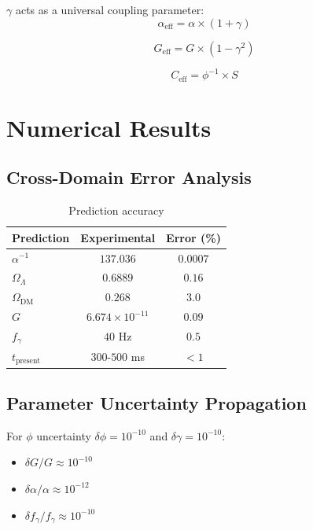 \documentclass[12pt,a4paper]{article}
\begin{document}
$\gamma$ acts as a universal coupling parameter:
\begin{equation}
\alpha_{\text{eff}} = \alpha \times (1 + \gamma)
\end{equation}

\begin{equation}
G_{\text{eff}} = G \times (1 - \gamma^2)
\end{equation}

\begin{equation}
C_{\text{eff}} = \phi^{-1} \times S
\end{equation}

\section{Numerical Results}

\subsection{Cross-Domain Error Analysis}

\begin{table}[h]
\centering
\begin{tabular}{lcc}
\toprule
Prediction & Experimental & Error (\%) \\
\midrule
$\alpha^{-1}$ & $137.036$ & $0.0007$ \\
$\Omega_\Lambda$ & $0.6889$ & $0.16$ \\
$\Omega_{\text{DM}}$ & $0.268$ & $3.0$ \\
$G$ & $6.674 \times 10^{-11}$ & $0.09$ \\
$f_\gamma$ & $40$ Hz & $0.5$ \\
$t_{\text{present}}$ & $300\text{-}500$ ms & $< 1$ \\
\bottomrule
\end{tabular}
\caption{Prediction accuracy}
\end{table}

\subsection{Parameter Uncertainty Propagation}

For $\phi$ uncertainty $\delta\phi = 10^{-10}$ and $\delta\gamma = 10^{-10}$:
\begin{itemize}
\item $\delta G/G \approx 10^{-10}$
\item $\delta\alpha/\alpha \approx 10^{-12}$
\item $\delta f_\gamma/f_\gamma \approx 10^{-10}$
\end{itemize}
\end{document}
